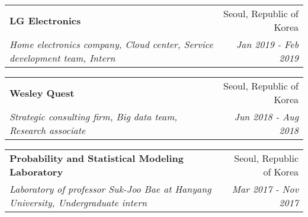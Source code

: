\documentclass[a4paper,11pt]{article}
\makeatletter
\newcommand{\resumeSubheading}[4]{
  \vspace{-1pt}\item
    \begin{tabular*}{0.97\textwidth}[t]{l@{\extracolsep{\fill}}r}
      \textbf{#1} & #2 \\
      \textit{\small#3} & \textit{\small #4} \\
    \end{tabular*}\vspace{-1.5pt} %
}
\makeatother
\begin{document}
{%

    \resumeSubheading
      {LG Electronics}{Seoul, Republic of Korea}
      {Home electronics company, Cloud center, Service development team, Intern}{Jan 2019 - Feb 2019}


    \resumeSubheading
      {Wesley Quest}{Seoul, Republic of Korea}
      {Strategic consulting firm, Big data team, Research associate}{Jun 2018 - Aug 2018}


    \resumeSubheading
      {Probability and Statistical Modeling Laboratory}{Seoul, Republic of Korea}
      {Laboratory of professor Suk-Joo Bae at Hanyang University, Undergraduate intern}{Mar 2017 - Nov 2017}

}
\end{document}

